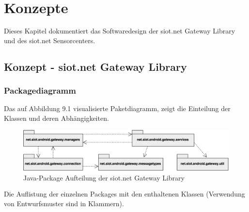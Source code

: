 \chapter{Konzepte}
Dieses Kapitel dokumentiert das Softwaredesign der siot.net Gateway Library und des siot.net Sensorcenters.
\section{Konzept - siot.net Gateway Library}
\subsection{Packagediagramm}
Das auf Abbildung 9.1 visualisierte Paketdiagramm, zeigt die Einteilung der Klassen und deren Abhängigkeiten.
\begin{figure}[H]
  \centering
  \includegraphics[scale=0.3]{98_Bilder/09_Konzept/PackagediagrammSiotNetGatewayLibrary}
  \caption[siot.net Gateway Library Packagediagramm]{Java-Package Aufteilung der siot.net Gateway Library}
\end{figure}
Die Auflistung der einzelnen Packages mit den enthaltenen Klassen (Verwendung von Entwurfsmuster sind in Klammern).
